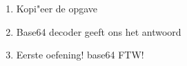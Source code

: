 \begin{enumerate}
  \item Kopi"eer de opgave
  \item Base64 decoder geeft ons het antwoord
  \item Eerste oefening! base64 FTW!
\end{enumerate}